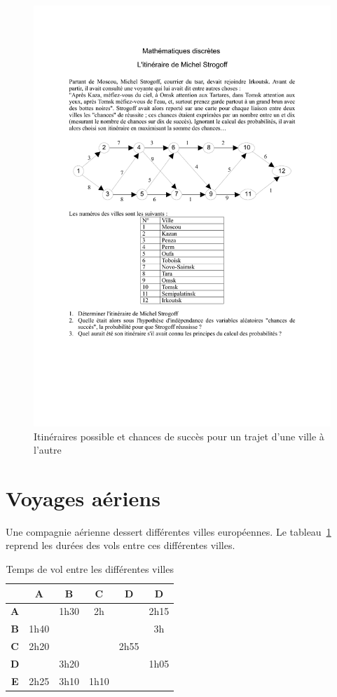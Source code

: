 \documentclass[paper=a4, fontsize=11pt]{scrartcl} %
\numberwithin{equation}{section} %
\numberwithin{figure}{section} %
\numberwithin{table}{section} %
\begin{document}
\begin{figure}[htbp]
\begin{center}
	\includegraphics[width=.8\textwidth]{strogoff.pdf}
	\caption{Itinéraires possible et chances de succès pour un trajet d'une ville à l'autre}
	\label{fig:ms}
\end{center}
\end{figure}

\section{Voyages aériens}

Une compagnie aérienne dessert différentes villes européennes. Le tableau~\ref{gr:airtravel} reprend les durées des vols entre ces différentes villes. 

\begin{table}[htbp]
\begin{center}

\begin{tabular}{|c|c|c|c|c|c|}
\hline 
 & \textbf{A}  & \textbf{B} & \textbf{C} & \textbf{D} & \textbf{D} \\ 
\hline 
\textbf{A} &  & 1h30  & 2h &  & 2h15 \\ 
\hline 
\textbf{B} & 1h40 &  &  &  & 3h \\ 
\hline 
\textbf{C} & 2h20 &  &  & 2h55 &  \\ 
\hline 
\textbf{D} &  & 3h20 &  &  & 1h05 \\ 
\hline 
\textbf{E} & 2h25 & 3h10 & 1h10 &  &  \\ 
\hline 
\end{tabular} 
\caption{Temps de vol entre les différentes villes}
\label{gr:airtravel}
\end{center}
\end{table}
\end{document}
